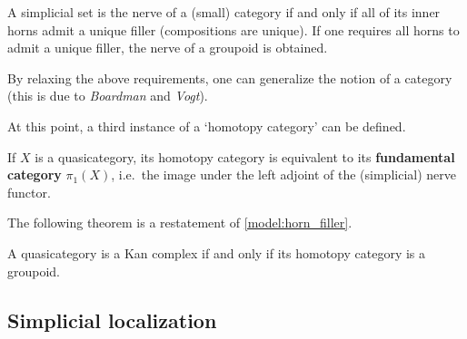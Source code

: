     \begin{property}\label{model:horn_filler}
        A simplicial set is the nerve of a (small) category if and only if all of its inner horns admit a unique filler (compositions are unique). If one requires all horns to admit a unique filler, the nerve of a groupoid is obtained.
    \end{property}

    By relaxing the above requirements, one can generalize the notion of a category (this is due to \textit{Boardman} and \textit{Vogt}).

    At this point, a third instance of a `homotopy category' can be defined.
    \begin{property}
        If $X$ is a quasicategory, its homotopy category is equivalent to its \textbf{fundamental category} $\pi_1(X)$, i.e.~the image under the left adjoint of the (simplicial) nerve functor.
    \end{property}

    The following theorem is a restatement of \cref{model:horn_filler}.
    \begin{theorem}[Joyal]
        A quasicategory is a Kan complex if and only if its homotopy category is a groupoid.
    \end{theorem}

\subsection{Simplicial localization}


